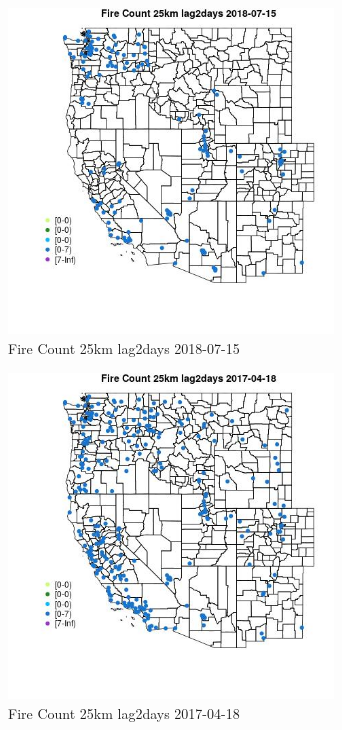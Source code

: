 \begin{figure} 
\centering  
\includegraphics[width=0.77\textwidth]{Code_Outputs/Report_ML_input_PM25_Step4_part_e_de_duplicated_aves_compiled_2019-05-20wNAs_MapObsFire_Count_25km_lag2days2018-07-15.jpg} 
\caption{\label{fig:Report_ML_input_PM25_Step4_part_e_de_duplicated_aves_compiled_2019-05-20wNAsMapObsFire_Count_25km_lag2days2018-07-15}Fire Count 25km lag2days 2018-07-15} 
\end{figure} 
 

\clearpage 

\begin{figure} 
\centering  
\includegraphics[width=0.77\textwidth]{Code_Outputs/Report_ML_input_PM25_Step4_part_e_de_duplicated_aves_compiled_2019-05-20wNAs_MapObsFire_Count_25km_lag2days2017-04-18.jpg} 
\caption{\label{fig:Report_ML_input_PM25_Step4_part_e_de_duplicated_aves_compiled_2019-05-20wNAsMapObsFire_Count_25km_lag2days2017-04-18}Fire Count 25km lag2days 2017-04-18} 
\end{figure} 
 

